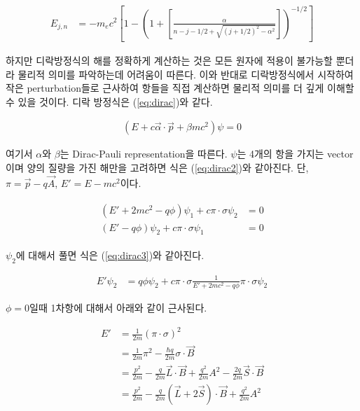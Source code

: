 \documentclass[%
 reprint,
 amsmath,amssymb,
 aps,
]{revtex4-2}
\begin{document}
\begin{widetext}
\begin{align}
	E_{j,n} &= -m_{e}c^{2}\left[ 1- \left( 1 + \left[ \frac{\alpha}{n-j-1/2+\sqrt{(j+1/2)^{2}-\alpha^{2}}} \right] \right)^{-1/2} \right]\label{eq:perfecteq}
\end{align}
\end{widetext}

하지만 디락방정식의 해를 정확하게 계산하는 것은 모든 원자에 적용이 불가능할 뿐더라 물리적 의미를 파악하는데 어려움이 따른다. 이와 반대로 디락방정식에서 시작하여 작은 perturbation들로 근사하여 항들을 직접 계산하면 물리적 의미를 더 깊게 이해할 수 있을 것이다. 디락 방정식은 (\ref{eq:dirac})와 같다.

\begin{align}
	(E+c\vec{\alpha}\cdot\vec{p}+\beta mc^{2})\psi = 0\label{eq:dirac}
\end{align}

여기서 $\alpha$와 $\beta$는 Dirac-Pauli representation을 따른다. $\psi$는 4개의 항을 가지는 vector이며 양의 질량을 가진 해만을 고려하면 식은 (\ref{eq:dirac2})와 같아진다. 단, $\pi = \vec{p}-q\vec{A}$, $E' = E-mc^{2}$이다. 

\begin{align}
	\begin{aligned}\label{eq:dirac2}
		(E'+2mc^{2}-q\phi)\psi_{1} + c\pi\cdot\sigma\psi_{2} &=0\\
		(E'-q\phi)\psi_{2}+c\pi\cdot\sigma\psi_{1} &= 0
	\end{aligned}
\end{align}

$\psi_{2}$에 대해서 풀면 식은 (\ref{eq:dirac3})와 같아진다. 

\begin{align}
	E'\psi_{2} &= q\phi\psi_{2}+ c\pi\cdot\sigma\frac{1}{E'+2mc^{2}-q\phi}\pi\cdot\sigma\psi_{2}\label{eq:dirac3}
\end{align}

$\phi =0$일때  1차항에 대해서 아래와 같이 근사된다.

\begin{align}
	E' &= \frac{1}{2m}(\pi\cdot\sigma)^{2}\\
	&= \frac{1}{2m}\pi^{2}-\frac{\hbar q}{2m} \sigma \cdot \vec{B}\\
	&= \frac{p^{2}}{2m} - \frac{q}{2m}\vec{L}\cdot\vec{B}+\frac{q^{2}}{2m}A^{2}-\frac{2q}{2m} \vec{S}\cdot \vec{B}\\
	&= \frac{p^{2}}{2m} -\frac{q}{2m}(\vec{L}+2\vec{S})\cdot\vec{B}+\frac{q^{2}}{2m}A^{2}\label{eq:rel_zeeman}
\end{align}
\end{document}
